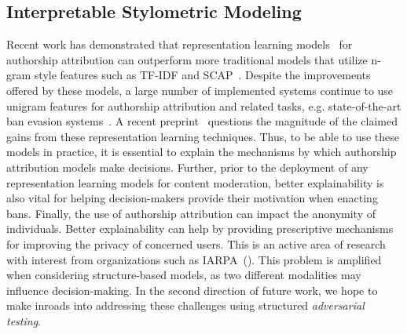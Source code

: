 \subsection{Interpretable Stylometric Modeling}
Recent work has demonstrated that representation learning models~\cite{andrews2019learning,maneriker2021sysml,riverastao2021learning} for authorship attribution can outperform more traditional models that utilize n-gram style features such as TF-IDF and SCAP~\cite{frantzeskou2007identifying}.
Despite the improvements offered by these models, a large number of implemented systems continue to use unigram features for authorship attribution and related tasks, e.g. state-of-the-art ban evasion systems~\cite{niverthi2022characterizing}.
A recent preprint~\citep{tyo2022state} questions the magnitude of the claimed gains from these representation learning techniques.
Thus, to be able to use these models in practice, it is essential to explain the mechanisms by which authorship attribution models make decisions.
Further, prior to the deployment of any representation learning models for content moderation, better explainability is also vital for helping decision-makers provide their motivation when enacting bans.
Finally, the use of authorship attribution can impact the anonymity of individuals.
Better explainability can help by providing prescriptive mechanisms for improving the privacy of concerned users.
This is an active area of research with interest from organizations such as IARPA~(\citeyear{hiatus2022iarpa}).
This problem is amplified when considering structure-based models, as two different modalities may influence decision-making.
In the second direction of future work, we hope to make inroads into addressing these challenges using structured \textit{adversarial testing}.

